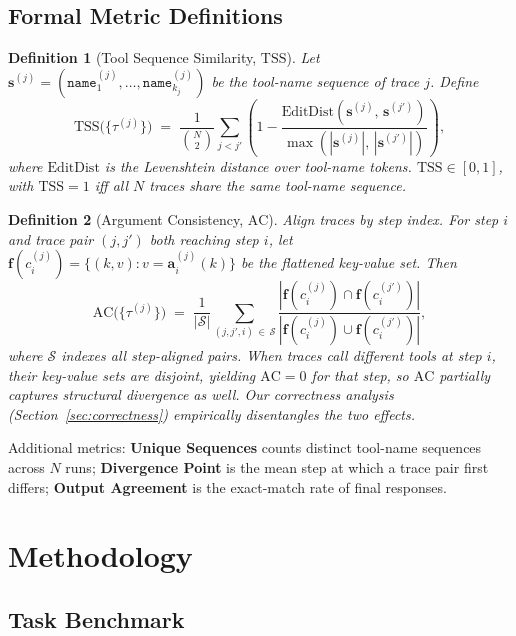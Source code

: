 \documentclass[11pt]{article}
\newtheorem{definition}{Definition}
\newcommand{\tss}{\mathrm{TSS}}
\newcommand{\ac}{\mathrm{AC}}
\begin{document}
\subsection{Formal Metric Definitions}
\label{sec:metrics}

\begin{definition}[Tool Sequence Similarity, $\tss$]
Let $\mathbf{s}^{(j)} = (\mathtt{name}_1^{(j)}, \ldots, \mathtt{name}_{k_j}^{(j)})$
be the tool-name sequence of trace $j$. Define
\[
  \tss\bigl(\{\tau^{(j)}\}\bigr)
  \;=\;
  \frac{1}{\binom{N}{2}}
  \sum_{j < j'} \!\left(
    1 - \frac{\mathrm{EditDist}(\mathbf{s}^{(j)},\,\mathbf{s}^{(j')})}
             {\max(|\mathbf{s}^{(j)}|,\,|\mathbf{s}^{(j')}|)}
  \right),
\]
where $\mathrm{EditDist}$ is the Levenshtein distance over tool-name tokens.
$\tss \in [0,1]$, with $\tss = 1$ iff all $N$ traces share the same
tool-name sequence.
\end{definition}

\begin{definition}[Argument Consistency, $\ac$]
Align traces by step index. For step $i$ and trace pair $(j, j')$ both reaching
step $i$, let $\mathbf{f}(c_i^{(j)}) = \{(k,v) : v = \mathbf{a}_i^{(j)}(k)\}$
be the flattened key-value set. Then
\[
  \ac\bigl(\{\tau^{(j)}\}\bigr)
  \;=\;
  \frac{1}{|\mathcal{S}|}
  \sum_{(j,j',i)\,\in\,\mathcal{S}}
  \frac{|\mathbf{f}(c_i^{(j)}) \cap \mathbf{f}(c_i^{(j')})|}
       {|\mathbf{f}(c_i^{(j)}) \cup \mathbf{f}(c_i^{(j')})|},
\]
where $\mathcal{S}$ indexes all step-aligned pairs. When traces call different
tools at step $i$, their key-value sets are disjoint, yielding $\ac = 0$ for that
step, so $\ac$ partially captures structural divergence as well. Our correctness
analysis (Section~\ref{sec:correctness}) empirically disentangles the two effects.
\end{definition}

Additional metrics: \textbf{Unique Sequences} counts distinct tool-name sequences
across $N$ runs; \textbf{Divergence Point} is the mean step at which a trace pair
first differs; \textbf{Output Agreement} is the exact-match rate of final
responses.

\section{Methodology}

\subsection{Task Benchmark}
\label{sec:benchmark}
\end{document}
